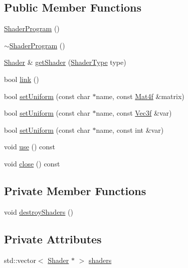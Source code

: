 \subsection*{Public Member Functions}
\begin{DoxyCompactItemize}
\item 
\hyperlink{classpcs_1_1ShaderProgram_aaf1133ce281667af24c085c680bd3aa3}{Shader\+Program} ()
\item 
\hyperlink{classpcs_1_1ShaderProgram_a6590bd48ce2dcba47c4a7f384d5d3316}{$\sim$\+Shader\+Program} ()
\item 
\hyperlink{classpcs_1_1Shader}{Shader} \& \hyperlink{classpcs_1_1ShaderProgram_ac1bc6629613f24f64887d224accd3aa8}{get\+Shader} (\hyperlink{namespacepcs_a2f6dfe5fadf3611302a9b7259502c3c9}{Shader\+Type} type)
\item 
bool \hyperlink{classpcs_1_1ShaderProgram_ae362fd3f64327ed7d670fee03d28ab27}{link} ()
\item 
bool \hyperlink{classpcs_1_1ShaderProgram_a59765d6a577e400ef261ec9e9cfa7078}{set\+Uniform} (const char $\ast$name, const \hyperlink{structpcs_1_1Mat4f}{Mat4f} \&matrix)
\item 
bool \hyperlink{classpcs_1_1ShaderProgram_a1ff8e923df23c341d5609ca4e65a2dad}{set\+Uniform} (const char $\ast$name, const \hyperlink{namespacepcs_a68e0f517680976c17c810ffe6952cbab}{Vec3f} \&var)
\item 
bool \hyperlink{classpcs_1_1ShaderProgram_af37a2a9c024a7f6dca60f10ab281510d}{set\+Uniform} (const char $\ast$name, const int \&var)
\item 
void \hyperlink{classpcs_1_1ShaderProgram_a48d59dd2b34d48355ba56dd6a85eb7cf}{use} () const
\item 
void \hyperlink{classpcs_1_1ShaderProgram_ac5cae1dc9d1ee6433a219ab2dd6a7bc9}{close} () const
\end{DoxyCompactItemize}
\subsection*{Private Member Functions}
\begin{DoxyCompactItemize}
\item 
void \hyperlink{classpcs_1_1ShaderProgram_ac8b44e80a46e16598b37c96169fce908}{destroy\+Shaders} ()
\end{DoxyCompactItemize}
\subsection*{Private Attributes}
\begin{DoxyCompactItemize}
\item 
std\+::vector$<$ \hyperlink{classpcs_1_1Shader}{Shader} $\ast$ $>$ \hyperlink{classpcs_1_1ShaderProgram_a3e0f3697d57eeaf50e3d1d6bc9b18021}{shaders}
\end{DoxyCompactItemize}
